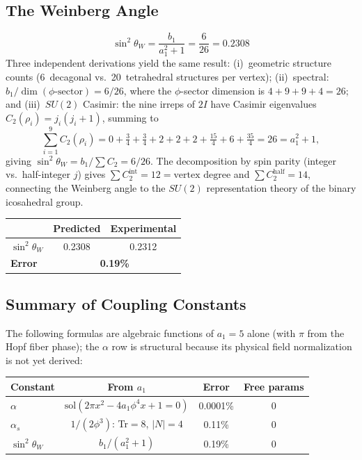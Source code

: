 \documentclass[12pt,a4paper]{article}
\theoremstyle{definition}
\begin{document}
\subsection{The Weinberg Angle}

\begin{equation}
\boxed{\sin^2\theta_W = \frac{b_1}{a_1^2 + 1} = \frac{6}{26} = 0.2308}
\label{eq:weinberg}
\end{equation}
Three independent derivations yield the same result: (i)~geometric structure counts (6~decagonal vs.\ 20~tetrahedral structures per vertex); (ii)~spectral: $b_1 / \dim(\phi\text{-sector}) = 6/26$, where the $\phi$-sector dimension is $4 + 9 + 9 + 4 = 26$; and (iii)~$SU(2)$ Casimir: the nine irreps of $2I$ have Casimir eigenvalues $C_2(\rho_i) = j_i(j_i+1)$, summing to
\begin{equation}
\sum_{i=1}^{9} C_2(\rho_i) = 0 + \tfrac{3}{4} + \tfrac{3}{4} + 2 + 2 + 2 + \tfrac{15}{4} + 6 + \tfrac{35}{4} = 26 = a_1^2 + 1,
\label{eq:casimir_sum}
\end{equation}
giving $\sin^2\theta_W = b_1 / \sum C_2 = 6/26$.  The decomposition by spin parity (integer vs.\ half-integer $j$) gives $\sum C_2^{\text{int}} = 12 = \text{vertex degree}$ and $\sum C_2^{\text{half}} = 14$, connecting the Weinberg angle to the $SU(2)$ representation theory of the binary icosahedral group.

\begin{center}
\begin{tabular}{lcc}
\toprule
& \textbf{Predicted} & \textbf{Experimental} \\
\midrule
$\sin^2\theta_W$ & 0.2308 & 0.2312 \\
\textbf{Error} & \multicolumn{2}{c}{\textbf{0.19\%}} \\
\bottomrule
\end{tabular}
\end{center}

\subsection{Summary of Coupling Constants}

The following formulas are algebraic functions of $a_1 = 5$ alone (with $\pi$ from the Hopf fiber phase); the $\alpha$ row is structural because its physical field normalization is not yet derived:

\begin{center}
\begin{tabular}{lccc}
\toprule
\textbf{Constant} & \textbf{From $a_1$} & \textbf{Error} & \textbf{Free params} \\
\midrule
$\alpha$ & $\text{sol}(2\pi x^2 - 4a_1\phi^4 x + 1 = 0)$ & 0.0001\% & 0 \\
$\alpha_s$ & $1/(2\phi^3)$: Tr$=8$, $|N|=4$ & 0.11\% & 0 \\
$\sin^2\theta_W$ & $b_1/(a_1^2+1)$ & 0.19\% & 0 \\
\bottomrule
\end{tabular}
\end{center}
\end{document}
